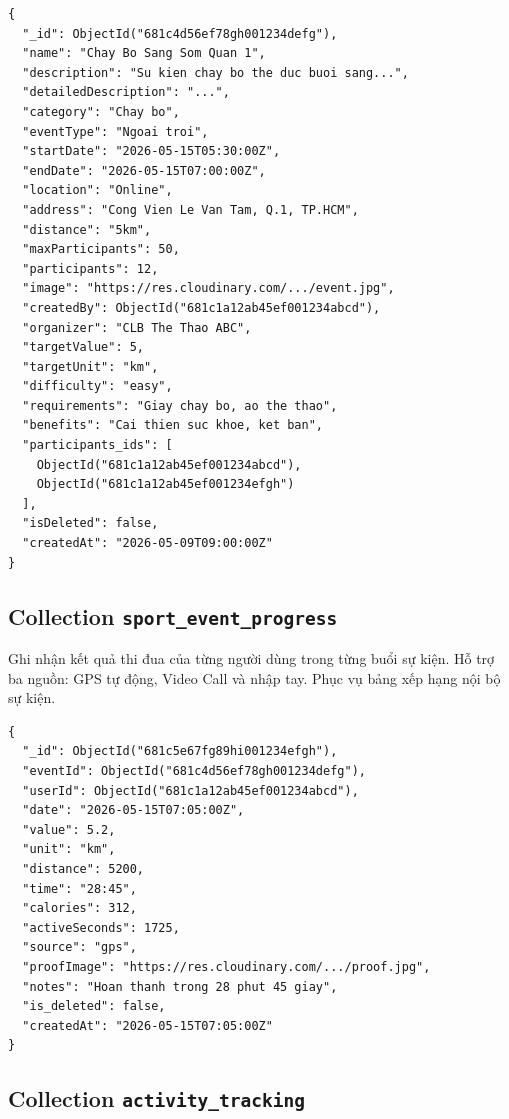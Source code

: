 \begin{verbatim}
{
  "_id": ObjectId("681c4d56ef78gh001234defg"),
  "name": "Chay Bo Sang Som Quan 1",
  "description": "Su kien chay bo the duc buoi sang...",
  "detailedDescription": "...",
  "category": "Chay bo",
  "eventType": "Ngoai troi",
  "startDate": "2026-05-15T05:30:00Z",
  "endDate": "2026-05-15T07:00:00Z",
  "location": "Online",
  "address": "Cong Vien Le Van Tam, Q.1, TP.HCM",
  "distance": "5km",
  "maxParticipants": 50,
  "participants": 12,
  "image": "https://res.cloudinary.com/.../event.jpg",
  "createdBy": ObjectId("681c1a12ab45ef001234abcd"),
  "organizer": "CLB The Thao ABC",
  "targetValue": 5,
  "targetUnit": "km",
  "difficulty": "easy",
  "requirements": "Giay chay bo, ao the thao",
  "benefits": "Cai thien suc khoe, ket ban",
  "participants_ids": [
    ObjectId("681c1a12ab45ef001234abcd"),
    ObjectId("681c1a12ab45ef001234efgh")
  ],
  "isDeleted": false,
  "createdAt": "2026-05-09T09:00:00Z"
}
\end{verbatim}

\subsection{Collection \texttt{sport\_event\_progress}}
\label{subsec:col_event_progress}

Ghi nhận kết quả thi đua của từng người dùng trong từng buổi sự kiện. Hỗ trợ ba nguồn: GPS tự động, Video Call và nhập tay. Phục vụ bảng xếp hạng nội bộ sự kiện.

\begin{verbatim}
{
  "_id": ObjectId("681c5e67fg89hi001234efgh"),
  "eventId": ObjectId("681c4d56ef78gh001234defg"),
  "userId": ObjectId("681c1a12ab45ef001234abcd"),
  "date": "2026-05-15T07:05:00Z",
  "value": 5.2,
  "unit": "km",
  "distance": 5200,
  "time": "28:45",
  "calories": 312,
  "activeSeconds": 1725,
  "source": "gps",
  "proofImage": "https://res.cloudinary.com/.../proof.jpg",
  "notes": "Hoan thanh trong 28 phut 45 giay",
  "is_deleted": false,
  "createdAt": "2026-05-15T07:05:00Z"
}
\end{verbatim}

\subsection{Collection \texttt{activity\_tracking}}
\label{subsec:col_activity_tracking}


